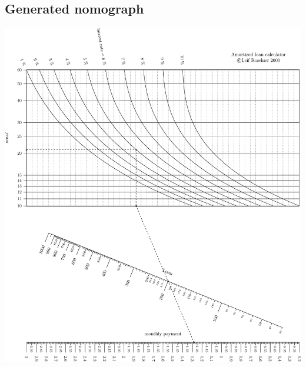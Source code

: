 \documentclass[a4paper,11pt,english]{sphinxmanual}
\begin{document}
\subsection{Generated nomograph}
\label{examples/examples:generated-nomograph}
\includegraphics{amortized_loan.pdf}
\end{document}
